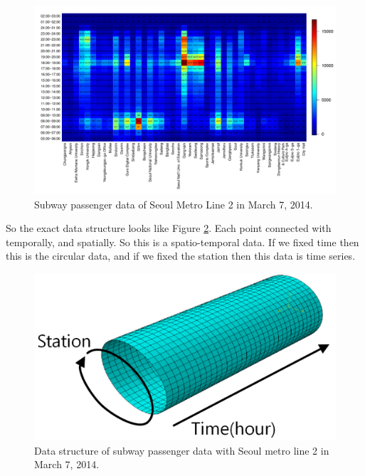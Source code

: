 \documentclass[preprint, review, 12pt]{article}
\theoremstyle{definition}
\theoremstyle{remark}
\begin{document}
\begin{figure}
	\centering
	\includegraphics[width=1.05\textwidth]{Fig/In_data.pdf}
	\vspace{-13mm}
	\caption{Subway passenger data of Seoul Metro Line 2 in March 7, 2014.}
	\label{snow:subway_in_0}
\end{figure}	

So the exact data structure looks like Figure \ref{snow:datasrt}. Each point connected with temporally, and spatially. So this is a spatio-temporal data. If we fixed time then this is the circular data, and if we fixed the station then this data is time series. 

\begin{figure}
\centering
\includegraphics[width=1\textwidth]{Fig/data_str.png}
\vspace{-13mm}
\caption{Data structure of subway passenger data with Seoul metro line 2 in March 7, 2014.} 
\label{snow:datasrt}
\end{figure}
\end{document}
